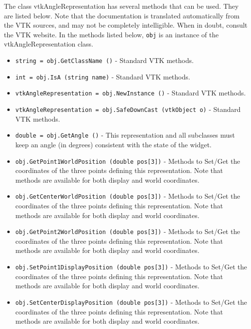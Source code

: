 The class vtkAngleRepresentation has several methods that can be used.
  They are listed below.
Note that the documentation is translated automatically from the VTK sources,
and may not be completely intelligible.  When in doubt, consult the VTK website.
In the methods listed below, \verb|obj| is an instance of the vtkAngleRepresentation class.
\begin{itemize}
\item  \verb|string = obj.GetClassName ()| -  Standard VTK methods.

\item  \verb|int = obj.IsA (string name)| -  Standard VTK methods.

\item  \verb|vtkAngleRepresentation = obj.NewInstance ()| -  Standard VTK methods.

\item  \verb|vtkAngleRepresentation = obj.SafeDownCast (vtkObject o)| -  Standard VTK methods.

\item  \verb|double = obj.GetAngle ()| -  This representation and all subclasses must keep an angle (in degrees)
 consistent with the state of the widget.

\item  \verb|obj.GetPoint1WorldPosition (double pos[3])| -  Methods to Set/Get the coordinates of the three points defining
 this representation. Note that methods are available for both
 display and world coordinates.

\item  \verb|obj.GetCenterWorldPosition (double pos[3])| -  Methods to Set/Get the coordinates of the three points defining
 this representation. Note that methods are available for both
 display and world coordinates.

\item  \verb|obj.GetPoint2WorldPosition (double pos[3])| -  Methods to Set/Get the coordinates of the three points defining
 this representation. Note that methods are available for both
 display and world coordinates.

\item  \verb|obj.SetPoint1DisplayPosition (double pos[3])| -  Methods to Set/Get the coordinates of the three points defining
 this representation. Note that methods are available for both
 display and world coordinates.

\item  \verb|obj.SetCenterDisplayPosition (double pos[3])| -  Methods to Set/Get the coordinates of the three points defining
 this representation. Note that methods are available for both
 display and world coordinates.


\end{itemize}
